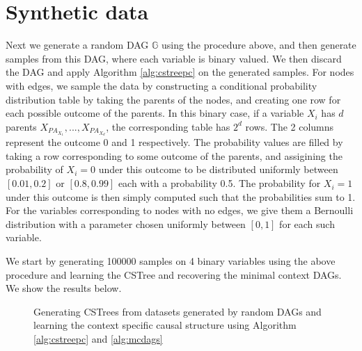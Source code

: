\documentclass{tufte-book}
\begin{document}
\section{Synthetic data}
\label{sec:orgb01549b}
Next we generate a random DAG \(\mathbb{G}\) using the procedure above, and then generate samples from this DAG, where each variable is binary valued. We then discard the DAG and apply Algorithm \ref{alg:cstreepc} on the generated samples. For nodes with edges, we sample the data by constructing a conditional probability distribution table by taking the parents of the nodes, and creating one row for each possible outcome of the parents. In this binary case, if a variable \(X_i\) has \(d\) parents \(X_{PA_{X_1}},...,X_{PA_{X_d}}\), the corresponding table has \(2^d\) rows. The 2 columns represent the outcome 0 and 1 respectively. The probability values are filled by taking a row corresponding to some outcome of the parents, and assigining the probability of \(X_i=0\) under this outcome to be distributed uniformly between \([0.01,0.2]\) or \([0.8,0.99]\) each with a probability 0.5. The probability for \(X_i=1\) under this outcome is then simply computed such that the probabilities sum to 1. For the variables corresponding to nodes with no edges, we give them a Bernoulli distribution with a parameter chosen uniformly between \([0,1]\) for each such variable.



We start by generating 100000 samples on 4 binary variables using the above procedure and learning the CSTree and recovering the minimal context DAGs. We show the results below.
\begin{figure}[!h]\label{fig:synthetic_exp1}
   \begin{floatrow}
%
\caption{Generating CSTrees from datasets generated by random DAGs and learning the context specific causal structure using Algorithm \ref{alg:cstreepc} and \ref{alg:mcdags}}
        
   \end{floatrow}
\end{figure}
\end{document}
